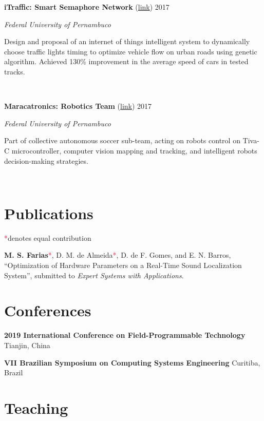 \documentclass[letterpaper,10pt]{article}
\newcommand{\entry}[4]{

\begin{minipage}[t]{.15\textwidth}
\end{minipage}
\hfill\vline\hfill 
\begin{minipage}[t]{0.95\textwidth}
#2 \hfill \textsc{#1}

\textit{#3}

\footnotesize{#4}
\end{minipage}\\\vspace{.25cm}}
\newcommand{\ufpe}{Federal University of Pernambuco}
\newcommand{\co}{\textcolor{crimson}{*}}
\begin{document}
\entry{2017}{\textbf{iTraffic: Smart Semaphore Network} (\href{https://www.cin.ufpe.br/~msf4/itraffic.html}{link})}{\ufpe}{
	Design and proposal of an internet of things intelligent system to dynamically choose traffic lights timing to optimize vehicle flow on urban roads using genetic algorithm. Achieved 130\% improvement in the average speed of cars in tested tracks.
}

\entry{2017}{\textbf{Maracatronics: Robotics Team} (\href{https://www.cin.ufpe.br/~msf4/maracatronics.html}{link})}{\ufpe}{
	Part of collective autonomous soccer sub-team, acting on robots control on Tiva-C microcontroller, computer vision mapping and tracking, and intelligent robots decision-making strategies.
}

\section{Publications}
\co denotes equal contribution

\begin{etaremune}
	\renewcommand{\labelenumi}{[J\theenumi]}
	\item \textbf{M. S. Farias}\co , D. M. de Almeida\co , D. de F. Gomes, and E. N. Barros, “Optimization of Hardware Parameters on a Real-Time Sound Localization System”, submitted to \textit{Expert Systems with Applications}.
\end{etaremune}\vspace{.25cm}

\section{Conferences}

\begin{etaremune}
	\item \textbf{2019 International Conference on Field-Programmable Technology}
	\hfill{Tianjin, China}
	\item \textbf{VII Brazilian Symposium on Computing Systems Engineering}
	\hfill{Curitiba, Brazil}
	\end{etaremune}

\section{Teaching}
\end{document}
